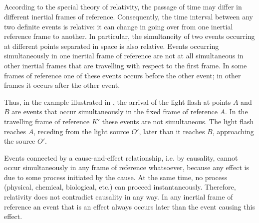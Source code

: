 \subsection{}\label{5.2.4} According to the special theory of relativity, the passage of time may differ in different inertial frames of reference. Consequently, the time interval between any two definite events is relative: it can change in going over from one inertial reference frame to another. In particular, the simultaneity of two events occurring at different points separated in space is also relative. Events occurring simultaneously in one inertial frame of reference are not at all simultaneous in other inertial frames that are travelling with respect to the first frame. In some frames of reference one of these events occurs before the other event; in other frames it occurs after the other event. 

Thus, in the example illustrated in  , the arrival of the light flash at points $A$ and $B$ are events that occur simultaneously in the fixed frame of reference $A$. In the travelling frame of reference $K'$ these events are not simultaneous. The light flash reaches $A$, receding from the light source $O'$, later than it reaches $B$, approaching the source $O'$.

Events connected by a cause-and-effect relationship, i.e. by causality, cannot occur simultaneously in any frame of reference whatsoever, because any effect is due to some process initiated by the cause. At the same time, no process (physical, chemical, biological, etc.) can proceed instantaneously. Therefore, relativity does not contradict causality in any way. In any inertial frame of reference an event that is an effect always occurs later than the event causing this effect.

